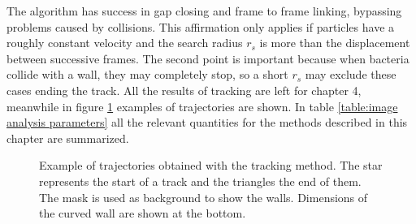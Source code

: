 The algorithm has success in gap closing and frame to frame linking, bypassing problems caused by collisions. This affirmation only applies if particles have a roughly constant velocity and the search radius $r_s$ is more than the displacement between successive frames. The second point is important because when bacteria collide with a wall, they may completely stop, so a short $r_s$ may exclude these cases ending the track. All the results of tracking are left for chapter 4, meanwhile in figure \ref{tracking_examples} examples of trajectories are shown. In table \ref{table:image analysis parameters} all the relevant quantities for the methods described in this chapter are summarized.

\begin{figure}
	\centering
	
	\caption[Example of trajectories]{Example of trajectories obtained with the tracking method. The star represents the start of a track and the triangles the end of them. The mask is used as background to show the walls. Dimensions of the curved wall are shown at the bottom.}
	\label{tracking_examples}
\end{figure}



